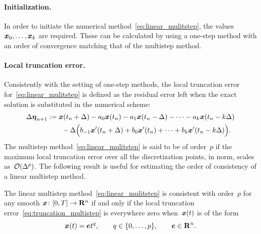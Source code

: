 \paragraph{Initialization.}
In order to initiate the numerical method~\eqref{eq:linear_mulitstep},
the values $\mathbf{\boldsymbol{x}}_0, \dotsc, \mathbf{\boldsymbol{x}}_{k}$ are required.
These can be calculated by using a one-step method with an order of convergence matching that of the multistep method.

\paragraph{Local truncation error.}
Consistently with the setting of one-step methods,
the local truncation error for~\eqref{eq:linear_mulitstep} is defined as the residual error left when the exact solution is substituted in the numerical scheme:
\begin{align}
    \nonumber
    \Delta \mathbf{\boldsymbol{\eta}}_{n+1}
        &:= \mathbf{\boldsymbol{x}}(t_n + \Delta) - a_0 \mathbf{\boldsymbol{x}}(t_n) - a_1 \mathbf{\boldsymbol{x}}(t_n - \Delta) - \dotsb - a_k \mathbf{\boldsymbol{x}}(t_n - k \Delta) \\
        \label{eq:truncation_multistep}
        & \qquad- \Delta \Bigl( b_{-1} \mathbf{\boldsymbol{x}}'(t_n + \Delta) + b_0 \mathbf{\boldsymbol{x}}'(t_n) + \dotsb + b_k \mathbf{\boldsymbol{x}}'(t_n - k \Delta) \Bigr).
\end{align}
The multistep method~\eqref{eq:linear_mulitstep} is said to be of order~$p$ if the maximum local truncation error
over all the discretization points, in norm, scales as~$\mathcal O(\Delta^p)$.
The following result is useful for estimating the order of consistency of a linear multistep method.
\begin{proposition}
    The linear multistep method~\eqref{eq:linear_mulitstep} is consistent with order~$p$ for any smooth $\mathbf{\boldsymbol{x}}\colon [0, T] \to \mathbf R^n$ if and only if
    the local truncation error~\eqref{eq:truncation_multistep} is everywhere zero when~$\mathbf{\boldsymbol{x}}(t)$ is of the form
    \begin{equation}
        \label{eq:polynomial_form}
        \mathbf{\boldsymbol{x}}(t) = \mathbf{\boldsymbol{e}} t^{q}, \qquad q \in \{0, \dotsc, p\},  \qquad \mathbf{\boldsymbol{e}} \in \mathbf R^n.
    \end{equation}
\end{proposition}
